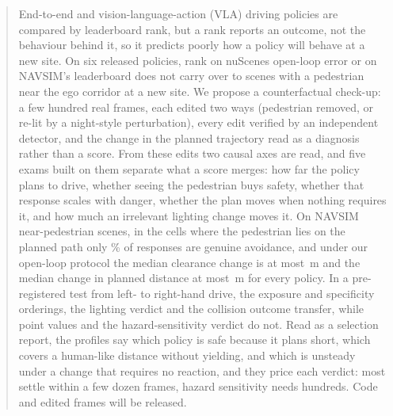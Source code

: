 \begin{abstract}
End-to-end and vision-language-action (VLA) driving policies are compared by leaderboard rank, but a rank reports an outcome, not the behaviour behind it, so it predicts poorly how a policy will behave at a new site.
On six released policies, rank on nuScenes open-loop error or on NAVSIM's leaderboard does not carry over to scenes with a pedestrian near the ego corridor at a new site.
We propose a counterfactual check-up: a few hundred real frames, each edited two ways (pedestrian removed, or re-lit by a night-style perturbation), every edit verified by an independent detector, and the change in the planned trajectory read as a diagnosis rather than a score. From these edits two causal axes are read, and five exams built on them separate what a score merges: how far the policy plans to drive, whether seeing the pedestrian buys safety, whether that response scales with danger, whether the plan moves when nothing requires it, and how much an irrelevant lighting change moves it.
On \NumSGscenes{} NAVSIM near-pedestrian scenes, in the cells where the pedestrian lies on the planned path only \NumCfRealPct\% of responses are genuine avoidance, and under our open-loop protocol the median clearance change is at most \NumCfDsHi\,m and the median change in planned distance at most \NumCfArcHi\,m for every policy. In a pre-registered test from left- to right-hand drive, the exposure and specificity orderings, the lighting verdict and the collision outcome transfer, while point values and the hazard-sensitivity verdict do not. Read as a selection report, the profiles say which policy is safe because it plans short, which covers a human-like distance without yielding, and which is unsteady under a change that requires no reaction, and they price each verdict: most settle within a few dozen frames, hazard sensitivity needs hundreds. Code and edited frames will be released.

\end{abstract}

